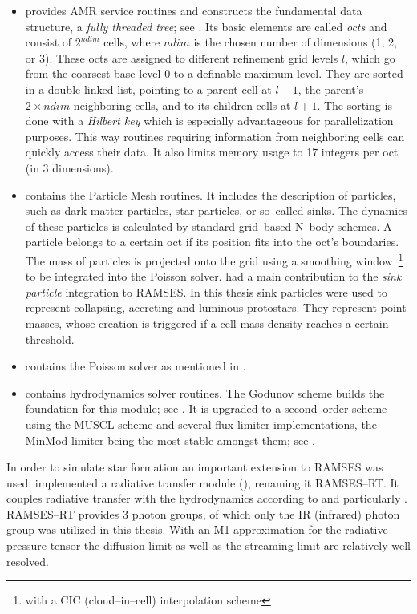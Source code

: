 \begin{itemize}
  \item {} provides AMR service routines and constructs the fundamental data structure, a \textit{fully threaded tree}; see \citet{Fully_Threaded_Tree}.
  Its basic elements are called \textit{octs} and consist of $2^{ndim}$ cells, where $ndim$ is the chosen number of dimensions (1, 2, or 3).
  These octs are assigned to different refinement grid levels $l$, which go from the coarsest base level $0$ to a definable maximum level.
  They are sorted in a double linked list, pointing to a parent cell at $l-1$, the parent's $2\times ndim$ neighboring cells, and to its children cells at $l+1$.
  The sorting is done with a \textit{Hilbert key} which is especially advantageous for parallelization purposes.
  This way routines requiring information from neighboring cells can quickly access their data.
  It also limits memory usage to 17 integers per oct (in 3 dimensions).
  \item {} contains the Particle Mesh routines.
  It includes the description of particles, such as dark matter particles, star particles, or so--called sinks.
  The dynamics of these particles is calculated by standard grid--based N--body schemes.
  A particle belongs to a certain oct if its position fits into the oct's boundaries.
  The mass of particles is projected onto the grid using a smoothing window~\footnote{with a CIC (cloud--in--cell) interpolation scheme} to be integrated into the Poisson solver.
  \citet{Andreas_sinks} had a main contribution to the \textit{sink particle} integration to RAMSES.
  In this thesis sink particles were used to represent collapsing, accreting and luminous protostars.
  They represent point masses, whose creation is triggered if a cell mass density reaches a certain threshold.
  \item {} contains the Poisson solver as mentioned in .
  \item {} contains hydrodynamics solver routines.
  The Godunov scheme builds the foundation for this module; see .
  It is upgraded to a second--order scheme using the MUSCL scheme and several flux limiter implementations, the MinMod limiter being the most stable amongst them; see .
\end{itemize}

In order to simulate star formation an important extension to RAMSES was used.
\citet{Joki_RT, Joki_IR} implemented a radiative transfer module (), renaming it RAMSES--RT.
It couples radiative transfer with the hydrodynamics according to  and particularly .
RAMSES--RT provides 3 photon groups, of which only the IR (infrared) photon group was utilized in this thesis.
With an M1 approximation for the radiative pressure tensor the diffusion limit as well as the streaming limit are relatively well resolved.


